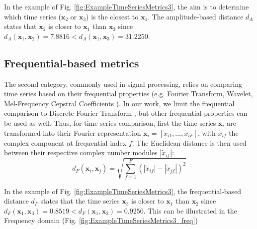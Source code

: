 In the example of Fig. \ref{fig:ExampleTimeSeriesMetrics3}, the aim is  to determine which time series ($\textbf{x}_2$ or $\textbf{x}_3$) is the closest to $\textbf{x}_1$. The amplitude-based distance $d_A$ states that $\textbf{x}_2$ is closer to $\textbf{x}_1$ than $\textbf{x}_3$ since $d_A(\textbf{x}_1,\textbf{x}_2) = 7.8816 < d_A(\textbf{x}_1,\textbf{x}_3)= 31.2250$.



\subsection{Frequential-based metrics}
The second category, commonly used in signal processing, relies on comparing time series based on their frequential properties (e.g. Fourier Transform, Wavelet, Mel-Frequency Cepstral Coefficients \cite{Sahidullah2012,Torrence1998,Brigham1967}). In our work, we limit the frequential comparison to Discrete Fourier Transform \cite{Lhermitte2011a}, but other frequential properties can be used as well. Thus, for time series comparison, first the time series $\textbf{x}_i$ are transformed into their Fourier representation $\tilde{\textbf{x}}_i=[\tilde{x}_{i1}, ...,  \tilde{x}_{iF}]$, with $\tilde{x}_{if}$ the complex component at frequential index $f$. The Euclidean distance is then used  between their respective complex number modules $|\tilde{x}_{if}|$:
\begin{equation}
d_{F}(\textbf{x}_i,\textbf{x}_j) = \sqrt{\sum_{f=1}^{F} 
	(|\tilde{x}_{if}|-|\tilde{x}_{jf}|)^2}
\label{eq:F}
\end{equation}

In the example of Fig. \ref{fig:ExampleTimeSeriesMetrics3}, the frequential-based distance $d_F$ states that the time series $\textbf{x}_3$ is closer to $\textbf{x}_1$ than $\textbf{x}_2$ since $d_F(\textbf{x}_1,\textbf{x}_3) = 0.8519 < d_F(\textbf{x}_1,\textbf{x}_2) = 0.9250$. This can be illustrated in the Frequency domain (Fig. \ref{fig:ExampleTimeSeriesMetrics3_freq})

